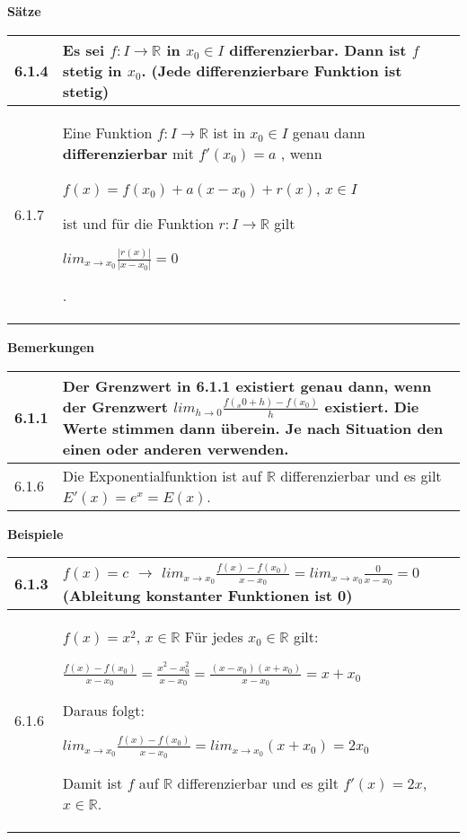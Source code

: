     \noindent 
    \textbf{Sätze}
    \begin{table}[H]
    \begin{tabularx}{\textwidth}{X m{16cm}}
        \toprule

        6.1.4 & Es sei $f: I \rightarrow \mathbb{R}$ in $x_0 \in I$ differenzierbar. Dann ist $f$ \textbf{stetig} in $x_0$. \hfill \break
                (Jede differenzierbare Funktion ist stetig) \\
        \midrule
        6.1.7 & Eine Funktion $f: I \rightarrow \mathbb{R}$ ist in $x_0 \in I$ genau dann \textbf{differenzierbar} mit $f'(x_0)=a$
                , wenn \hfill \break
                \centerline{$f(x) = f(x_0) + a(x-x_0)+r(x)$, $x \in I$}
                ist und für die Funktion $r: I \rightarrow \mathbb{R}$ gilt \hfill \break
                \centerline{$lim_{x \rightarrow x_0}\frac{|r(x)|}{|x-x_0|} = 0$}. \\

        \bottomrule
    \end{tabularx}
    \end{table}

    \noindent
    \textbf{Bemerkungen}
    \begin{table}[H]
    \begin{tabularx}{\textwidth}{X m{16cm}}
        \toprule

        6.1.1 & Der Grenzwert in 6.1.1 existiert genau dann, wenn der Grenzwert $lim_{h \rightarrow 0} \frac{f(_x0 + h)-f(x_0)}{h}$
                existiert. Die Werte stimmen dann überein. Je nach Situation den einen oder anderen verwenden. \\
        \midrule
        6.1.6 & Die Exponentialfunktion ist auf $\mathbb{R}$ differenzierbar und es gilt $E'(x) = e^x = E(x)$. \\

        \bottomrule
    \end{tabularx}
    \end{table}

    \noindent
    \textbf{Beispiele}
    \begin{table}[H]
    \begin{tabularx}{\textwidth}{X m{16cm}}
        \toprule

        6.1.3 & $f(x) = c$ $\rightarrow$ $lim_{x \rightarrow x_0} \frac{f(x)-f(x_0)}{x-x_0} = lim_{x \rightarrow x_0}
                                \frac{0}{x-x_0} = 0$ (Ableitung konstanter Funktionen ist 0) \\
        \midrule
        6.1.6 & $f(x) = x^2$, $x \in \mathbb{R}$ \hfill \break
                Für jedes $x_0 \in \mathbb{R}$ gilt: \hfill \break
                \centerline{$\frac{f(x)-f(x_0)}{x-x_0}= \frac{x^2-x_0^2}{x-x_0} = \frac{(x-x_0)(x+x_0)}{x-x_0} = x+x_0$}
                Daraus folgt: \hfill \break
                \centerline{$lim_{x \rightarrow x_0} \frac{f(x)-f(x_0)}{x-x_0} = lim_{x \rightarrow x_0}(x+x_0) = 2x_0$}
                Damit ist $f$ auf $\mathbb{R}$ differenzierbar und es gilt $f'(x) = 2x$, $x \in \mathbb{R}$. \\
        \bottomrule
    \end{tabularx}
    \end{table}

